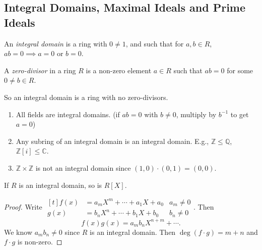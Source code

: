 \subsection{Integral Domains, Maximal Ideals and Prime Ideals}
\leavevmode
\begin{definition}{}{}
    An \textit{integral domain}  is a ring with \(0 \neq 1\), and such that for \(a, b \in R\), \(ab = 0 \implies a = 0\) or \(b = 0\).

    A \textit{zero-divisor} in a ring \(R\) is a non-zero element \(a \in R\) such that \(ab = 0\) for some \(0 \neq b \in R\).

    So an integral domain is a ring with no zero-divisors.
\end{definition}
\begin{example}
    \leavevmode
    \begin{enumerate}
        \item All fields are integral domains. (if \(ab = 0\) with \(b \neq 0\), multiply by \(b^{-1}\) to get \(a = 0\))
        \item Any subring of an integral domain is an integral domain. E.g., \(\mathbb{Z} \leq \mathbb{Q}\), \(\mathbb{Z}[i] \leq \mathbb{C}\).
        \item \(\mathbb{Z} \times \mathbb{Z}\) is not an integral domain since \((1,0)\cdot (0,1) = (0,0)\).
    \end{enumerate}
\end{example}
\begin{lemma}{}{}
    If \(R\) is an integral domain, so is \(R[X]\).
\end{lemma}
\begin{proof}
    Write \(\begin{aligned}[t]f(x) &= a_m X^m + \cdots + a_1 X + a_0&a_m \neq 0\\ g(x) &= b_n X^n + \cdots + b_1 X + b_0 & b_n \neq 0\end{aligned}\). Then
    \[
        f(x)g(x) = a_{m}b_n X^{n + m} + \cdots.
    \]
    We know \(a_m b_n \neq 0\) since \(R\) is an integral domain. Then \(\deg(f\cdot g) = m + n\) and \(f\cdot g\) is non-zero.
\end{proof}